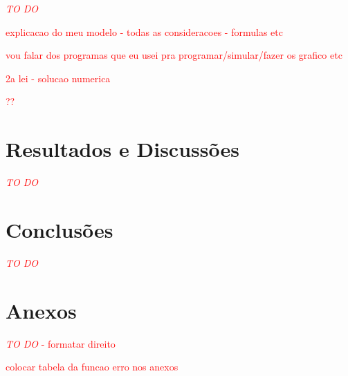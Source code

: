 \documentclass[]{politex}
\newcommand\myworries[1]{\textcolor{red}{#1}}
\begin{document}
\myworries{\textit{TO DO}}

\myworries{explicacao do meu modelo - todas as consideracoes - formulas etc}

\myworries{vou falar dos programas que eu usei pra programar/simular/fazer os grafico etc}


\myworries{2a lei - solucao numerica}



\myworries{??}

\chapter{Resultados e Discussões}
\myworries{\textit{TO DO}}

\chapter{Conclusões}
\myworries{\textit{TO DO}}






\chapter{Anexos}
\myworries{\textit{TO DO} - formatar direito}
\par
\myworries{colocar tabela da funcao erro nos anexos}
\end{document}
